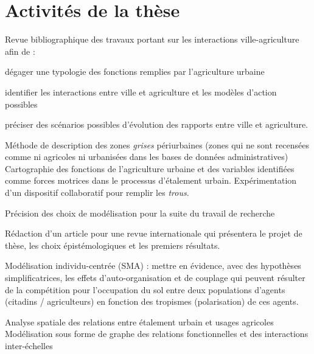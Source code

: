 \section{Activités de la thèse}

\subject{1ère année}

\startitemize[n]

\item	Revue bibliographique des travaux
	portant sur les interactions ville-agriculture
	afin de :

	\startitemize[a,packed]

	\item dégager une typologie des fonctions remplies par l'agriculture urbaine
	\item identifier les interactions entre ville et agriculture
	  et les modèles d'action possibles
	\item préciser des scénarios possibles d'évolution
	  des rapports entre ville et agriculture.

	  \stopitemize

\item	Méthode de description des zones {\em grises} périurbaines
	(zones qui ne sont recensées comme ni agricoles ni urbanisées
	dans les bases de données administratives)
	Cartographie des fonctions de l'agriculture urbaine
	et des variables identifiées comme forces motrices
	dans le processus d'étalement urbain.
	Expérimentation d'un dispositif collaboratif
	pour remplir les {\em trous}.

\item Précision des choix de modélisation
   pour la suite du travail de recherche

\item Rédaction d'un article pour une revue internationale
   qui présentera le projet de thèse,
   les choix épistémologiques et les premiers résultats.


\subject{2ème année}


\item	Modélisation individu-centrée (SMA) :
	mettre en évidence, avec des hypothèses simplificatrices,
	les effets d'auto-organisation et de couplage
	qui peuvent résulter de la compétition pour l'occupation du sol
	entre deux populations d'agents (citadins / agriculteurs)
	en fonction des tropismes (polarisation) de ces agents.

\item	Analyse spatiale des relations entre étalement urbain
	et usages agricoles
	Modélisation sous forme de graphe des relations fonctionnelles
	et des interactions inter-échelles


